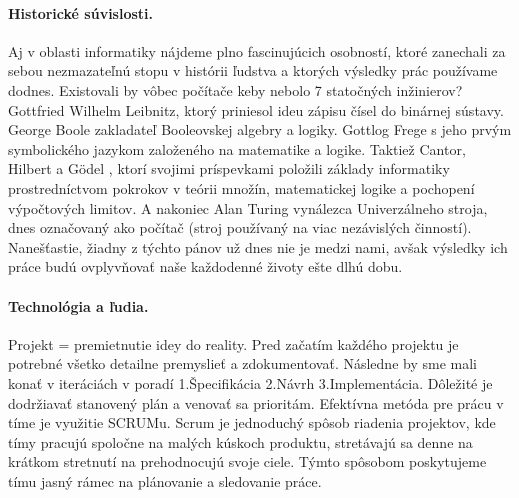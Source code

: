 \documentclass[10pt,slovak,a4paper]{article}
\begin{document}
\begin{enumerate}
\leavevmode \newline
\leavevmode \newline
\leavevmode \newline\leavevmode \newline
\leavevmode \newline
\leavevmode \newline\leavevmode \newline
\leavevmode \newline
\leavevmode \newline\leavevmode \newline
\leavevmode \newline
\leavevmode \newline
\leavevmode \newline
\label{fig:voice_assistant_users}
\paragraph{Historické súvislosti.}Aj v oblasti informatiky nájdeme plno fascinujúcich osobností, ktoré zanechali za sebou nezmazateľnú stopu v histórii ľudstva a ktorých výsledky prác používame dodnes. Existovali by vôbec počítače keby nebolo 7 statočných inžinierov? Gottfried Wilhelm Leibnitz, ktorý priniesol ideu zápisu čísel do binárnej sústavy. George Boole zakladateľ Booleovskej algebry a logiky. Gottlog Frege s jeho  prvým symbolického jazykom založeného na matematike a logike. Taktiež Cantor, Hilbert a Gödel , ktorí svojimi príspevkami položili základy informatiky prostredníctvom pokrokov v teórii množín, matematickej logike a pochopení výpočtových limitov. A nakoniec Alan Turing vynálezca Univerzálneho stroja, dnes označovaný ako počítač (stroj používaný na viac nezávislých činností). Nanešťastie, žiadny z týchto pánov už dnes nie je medzi nami, avšak výsledky ich práce budú ovplyvňovať naše každodenné životy ešte dlhú dobu.   
\paragraph{Technológia a ľudia.} Projekt = premietnutie idey do reality. Pred začatím každého projektu je potrebné všetko detailne premyslieť a zdokumentovať. Následne by sme mali konať v iteráciách v poradí 1.Špecifikácia 2.Návrh 3.Implementácia. Dôležité je dodržiavať stanovený plán a venovať sa prioritám. Efektívna metóda pre prácu v tíme je využitie SCRUMu. Scrum je jednoduchý spôsob riadenia projektov, kde tímy pracujú spoločne na malých kúskoch produktu, stretávajú sa denne na krátkom stretnutí na prehodnocujú svoje ciele. Týmto spôsobom poskytujeme tímu jasný rámec na plánovanie a sledovanie práce.

\end{enumerate}
\end{document}
